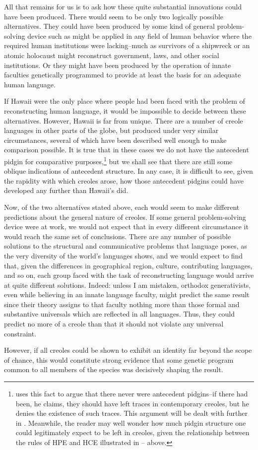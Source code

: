 All that remains for us is to ask how these quite substantial innovations could have been produced. There would seem to be only two logically possible alternatives. They could have been produced by some kind of general problem-solving device such as might be applied in any field of human behavior where the required human institutions were lacking--much as survivors of a shipwreck or an atomic holocaust might reconstruct government, laws, and other social institutions. Or they might have been produced by the operation of innate faculties genetically programmed to provide at least the basis for an adequate human language.

If Hawaii were the only place where people had been faced with the problem of reconstructing human language, it would be impossible to decide between these alternatives. However, Hawaii is far from unique. There are a number of creole languages in other parts of the globe, but produced under very similar circumstances, several of which have been described well enough to make comparison possible. It is true that in these cases we do not have the antecedent pidgin for comparative purposes,\footnote{\citet{Alleyne1979} uses this fact to argue that there never were antecedent pidgins--if there had been, he claims, they should have left traces in contemporary creoles, but he denies the existence of such traces. This argument will be dealt with further in . Meanwhile, the reader may well wonder how much pidgin structure one could legitimately expect to be left in creoles, given the relation\-ship between the rules of HPE and HCE illustrated in -- above.} but we shall see that there are still some oblique indications of antecedent structure. In any case, it is difficult to see, given the rapidity with which creoles arose, how those antecedent pidgins could have developed any further than Hawaii's did.


Now, of the two alternatives stated above, each would seem to make different predictions about the general nature of creoles. If some general problem-solving device were at work, we would not expect that in every different circumstance it would reach the same set of conclusions. There are any number of possible solutions to the struc\-tural and communicative problems that language poses, as the very diversity of the world's languages shows, and we would expect to find that, given the differences in geographical region, culture, contributing languages, and so on, each group faced with the task of reconstructing language would arrive at quite different solutions. Indeed: unless I am mistaken, orthodox generativists, even while believing in an innate language faculty, might predict the same result since their theory assigns to that faculty nothing more than those formal and substantive universals which are reflected in all languages. Thus, they could pre\-dict no more of a creole than that it should not violate any universal constraint.

However, if all creoles could be shown to exhibit an identity far beyond the scope of chance, this would constitute strong evidence that some genetic program common to all members of the species was decisively shaping the result.

